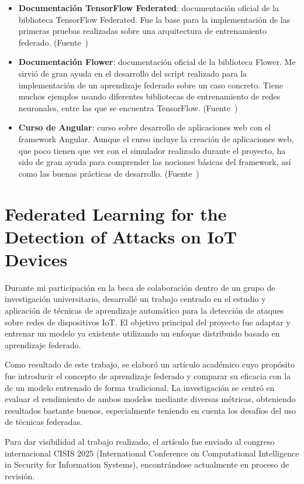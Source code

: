 \begin{itemize}
    \item \textbf{Documentación TensorFlow Federated}: documentación oficial de la biblioteca TensorFlow Federated. Fue la base para la implementación de las primeras pruebas realizadas sobre una arquitectura de entrenamiento federado. (Fuente~\cite{tensorflow_federated})
    \item \textbf{Documentación Flower}: documentación oficial de la biblioteca Flower. Me sirvió de gran ayuda en el desarrollo del script realizado para la implementación de un aprendizaje federado sobre un caso concreto. Tiene muchos ejemplos usando diferentes bibliotecas de entrenamiento de redes neuronales, entre las que se encuentra TensorFlow. (Fuente~\cite{flower})
    \item \textbf{Curso de Angular}: curso sobre desarrollo de aplicaciones web con el framework Angular. Aunque el curso incluye la creación de aplicaciones web, que poco tienen que ver con el simulador realizado durante el proyecto, ha sido de gran ayuda para comprender las nociones básicas del framework, así como las buenas prácticas de desarrollo. (Fuente~\cite{angular})
\end{itemize}

\section*{Federated Learning for the Detection of Attacks on IoT Devices}
\label{sec:articulo_academico}
Durante mi participación en la beca de colaboración dentro de un grupo de investigación universitario, desarrollé un trabajo centrado en el estudio y aplicación de técnicas de aprendizaje automático para la detección de ataques sobre redes de dispositivos IoT. El objetivo principal del proyecto fue adaptar y entrenar un modelo ya existente utilizando un enfoque distribuido basado en aprendizaje federado.

Como resultado de este trabajo, se elaboró un artículo académico cuyo propósito fue introducir el concepto de aprendizaje federado y comparar su eficacia con la de un modelo entrenado de forma tradicional. La investigación se centró en evaluar el rendimiento de ambos modelos mediante diversas métricas, obteniendo resultados bastante buenos, especialmente teniendo en cuenta los desafíos del uso de técnicas federadas.

Para dar visibilidad al trabajo realizado, el artículo fue enviado al congreso internacional CISIS 2025 (International Conference on Computational Intelligence in Security for Information Systems), encontrándose actualmente en proceso de revisión.
